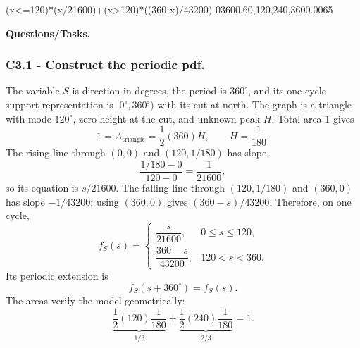 	\begingroup
	{(x<=120)*(x/21600)+(x>120)*((360-x)/43200)}
	{0}{360}{0,60,120,240,360}{0.0065}
	\endgroup
	
	\textbf{Questions/Tasks.}
	\begin{enumerate}
	\end{enumerate}
	
	\subsubsection*{C3.1 - Construct the periodic pdf.}
	\label{subsec:c3-triangular-scanner-a}
	The variable $S$ is direction in degrees, the period is $360^\circ$, and its
	one-cycle support representation is $[0^\circ,360^\circ)$ with its cut at
	north.  The graph is a
	triangle with mode $120^\circ$, zero height at the cut, and unknown peak $H$.
	Total area $1$ gives
	\[
	1=A_{\text{triangle}}=\frac12(360)H,\qquad H=\frac1{180}.
	\]
	The rising line through $(0,0)$ and $(120,1/180)$ has slope
	\[
	\frac{1/180-0}{120-0}=\frac1{21600},
	\]
	so its equation is $s/21600$.  The falling line through
	$(120,1/180)$ and $(360,0)$ has slope $-1/43200$; using $(360,0)$
	gives $(360-s)/43200$.  Therefore, on one cycle,
	\[
	f_S(s)=
	\begin{cases}
		\dfrac{s}{21600},&0\le s\le120,\\[2mm]
		\dfrac{360-s}{43200},&120<s<360.
	\end{cases}
	\]
	Its periodic extension is
	\[
	f_S(s+360^\circ)=f_S(s).
	\]
	The areas verify the model geometrically:
	\[
	\underbrace{\frac12(120)\frac1{180}}_{1/3}
	+\underbrace{\frac12(240)\frac1{180}}_{2/3}=1.
	\]
	
